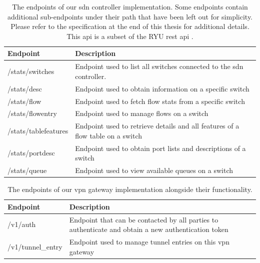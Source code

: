 \begin{table}[htp]
    \begin{tabularx}{\textwidth}{ |l|X| }
        \hline
        \textbf{Endpoint}    & \textbf{Description}                                                           \\
        \hline
        /stats/switches      & Endpoint used to list all switches connected to the \acrshort{sdn} controller. \\
        /stats/desc          & Endpoint used to obtain information on a specific switch                       \\
        \hline
        /stats/flow          & Endpoint used to fetch flow stats from a specific switch                       \\
        /stats/flowentry     & Endpoint used to manage flows on a switch                                      \\
        /stats/tablefeatures & Endpoint used to retrieve details and all features of a flow table on a switch \\
        /stats/portdesc      & Endpoint used to obtain port lists and descriptions of a switch                \\
        /stats/queue         & Endpoint used to view available queues on a switch                             \\
        \hline
    \end{tabularx}
    \caption[Controller endpoints]{The endpoints of our \acrshort{sdn} controller implementation. Some endpoints contain additional sub-endpoints under their path that have been left out for simplicity. Please refer to the specification at the end of this thesis for additional details. This \acrshort{api} is a subset of the RYU \acrshort{rest} \acrshort{api} \cite{ryu-rest}.}
    \label{table:controller}
\end{table}

\begin{table}[htp]
    \begin{tabularx}{\textwidth}{ |l|X| }
        \hline
        \textbf{Endpoint} & \textbf{Description}                                                                                \\
        \hline
        /v1/auth          & Endpoint that can be contacted by all parties to authenticate and obtain a new authentication token \\
        \hline
        /v1/tunnel\_entry & Endpoint used to manage tunnel entries on this \acrshort{vpn} gateway                               \\
        \hline
    \end{tabularx}
    \caption[\acrshort{vpn} gateway endpoints]{The endpoints of our \acrshort{vpn} gateway implementation alongside their functionality.}
    \label{table:vpn_gateway}
\end{table}

